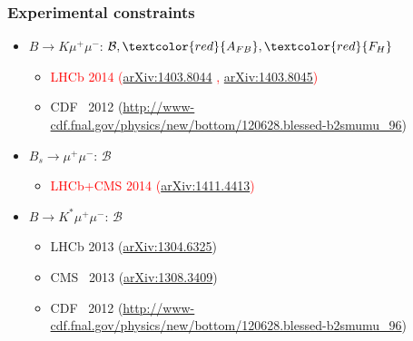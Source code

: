 \documentclass[english]{beamer}
\newcommand{\slide}[2][t]{\begin{frame}[#1] \frametitle{\insertsection} #2 \end{frame}}
\newcommand{\red}[1]{\textcolor{red}{#1}}
\begin{document}
\slide[c]{

    \frametitle{Experimental constraints}

    \begin{itemize}
        \item $B\rightarrow K\mu^+\mu^-$: $\mathcal{B} , \red{A_{FB}} , \red{F_H}$
        \begin{itemize}
            \item \red{LHCb 2014 {\tiny (\href{http://arXiv.org/abs/1403.8044}{arXiv:1403.8044} , \href{http://arXiv.org/abs/1403.8045}{arXiv:1403.8045})}}
            \item CDF~ 2012 {\tiny (\url{http://www-cdf.fnal.gov/physics/new/bottom/120628.blessed-b2smumu_96})}
        \end{itemize}

        \item $B_s\rightarrow\mu^+\mu^-$: $\mathcal{B}$

        \begin{itemize}
            \item \red{LHCb+CMS 2014 {\tiny({\href{http://arXiv.org/abs/1411.4413}{arXiv:1411.4413}})}}
        \end{itemize}

        \item $B\rightarrow K^\ast\mu^+\mu^-$: $\mathcal{B}$

        \begin{itemize}
            \item LHCb 2013 {\tiny({\href{http://arXiv.org/abs/1304.6325}{arXiv:1304.6325}})}
            \item CMS~ 2013 {\tiny({\href{http://arXiv.org/abs/1308.3409}{arXiv:1308.3409}})}
            \item CDF~ 2012 {\tiny (\url{http://www-cdf.fnal.gov/physics/new/bottom/120628.blessed-b2smumu_96})}
        \end{itemize}
    \end{itemize}

}
\end{document}
